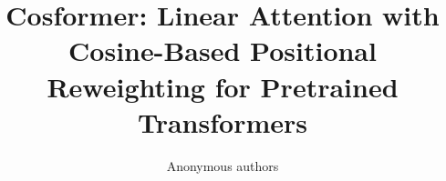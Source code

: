 \title{\textbf{Cosformer: Linear Attention with Cosine-Based Positional Reweighting for Pretrained Transformers}}

\author{Anonymous authors}
